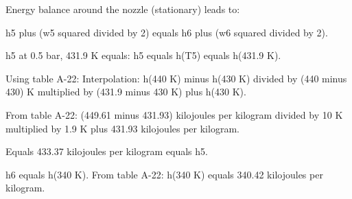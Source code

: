 Energy balance around the nozzle (stationary) leads to:  

h5 plus (w5 squared divided by 2) equals h6 plus (w6 squared divided by 2).  

h5 at 0.5 bar, 431.9 K equals:  
h5 equals h(T5) equals h(431.9 K).  

Using table A-22:  
Interpolation:  
h(440 K) minus h(430 K) divided by (440 minus 430) K multiplied by (431.9 minus 430 K) plus h(430 K).  

From table A-22:  
(449.61 minus 431.93) kilojoules per kilogram divided by 10 K multiplied by 1.9 K plus 431.93 kilojoules per kilogram.  

Equals 433.37 kilojoules per kilogram equals h5.  

h6 equals h(340 K).  
From table A-22:  
h(340 K) equals 340.42 kilojoules per kilogram.